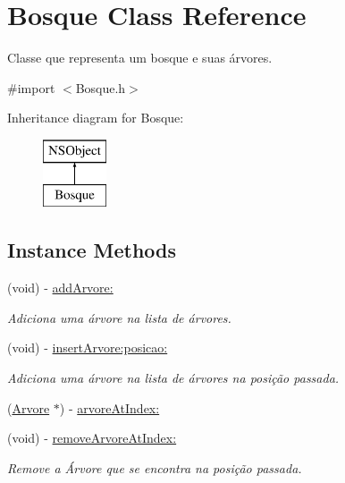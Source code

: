 \hypertarget{interface_bosque}{}\section{Bosque Class Reference}
\label{interface_bosque}


Classe que representa um bosque e suas árvores.  




{\ttfamily \#import $<$Bosque.\+h$>$}

Inheritance diagram for Bosque\+:\begin{figure}[H]
\begin{center}
\leavevmode
\includegraphics[height=2.000000cm]{interface_bosque}
\end{center}
\end{figure}
\subsection*{Instance Methods}
\begin{DoxyCompactItemize}
\item 
(void) -\/ \hyperlink{interface_bosque_a90cb846dcd7be916917b0990edc11536}{add\+Arvore\+:}
\begin{DoxyCompactList}\small\item\em Adiciona uma árvore na lista de árvores. \end{DoxyCompactList}\item 
(void) -\/ \hyperlink{interface_bosque_a8a118b351cafaf3734fc8c4567cfdb13}{insert\+Arvore\+:posicao\+:}
\begin{DoxyCompactList}\small\item\em Adiciona uma árvore na lista de árvores na posição passada. \end{DoxyCompactList}\item 
(\hyperlink{interface_arvore}{Arvore} $\ast$) -\/ \hyperlink{interface_bosque_a93e40a2af77bbfb6c4ea7a82121645dc}{arvore\+At\+Index\+:}
\item 
(void) -\/ \hyperlink{interface_bosque_a784405d0e2c80b45025157d1206eba7a}{remove\+Arvore\+At\+Index\+:}
\begin{DoxyCompactList}\small\item\em Remove a Árvore que se encontra na posição passada. \end{DoxyCompactList}\end{DoxyCompactItemize}

